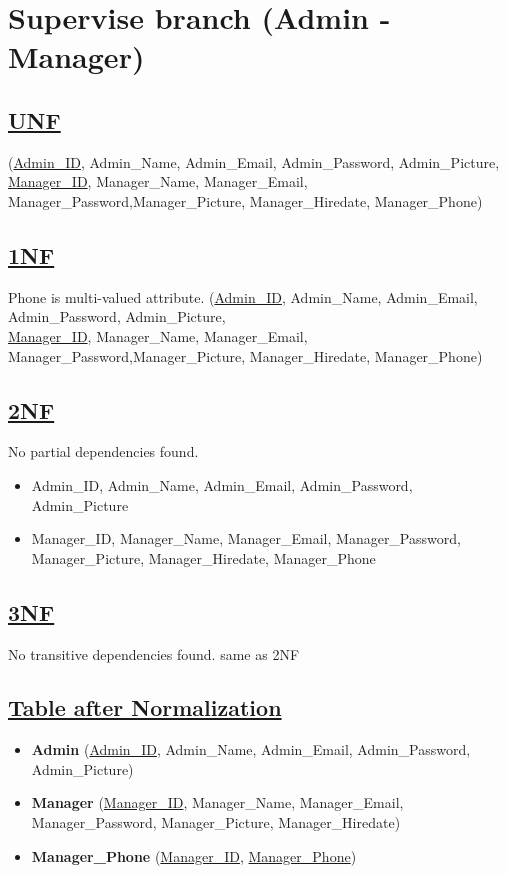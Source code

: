 \section{\texorpdfstring{\centering Supervise branch (Admin - Manager)}{Supervise branch (Admin - Manager)}}
\subsection*{\underline{UNF}}

(\underline{Admin\_ID}, Admin\_Name, Admin\_Email, Admin\_Password, Admin\_Picture,\\
\underline{Manager\_ID}, Manager\_Name, Manager\_Email, Manager\_Password,Manager\_Picture, Manager\_Hiredate, Manager\_Phone)

\subsection*{\underline{1NF}}
Phone is multi-valued attribute.
\vskip 0.2in
(\underline{Admin\_ID}, Admin\_Name, Admin\_Email, Admin\_Password, Admin\_Picture,\\
\underline{Manager\_ID}, Manager\_Name, Manager\_Email, Manager\_Password,Manager\_Picture, Manager\_Hiredate, Manager\_Phone)

\subsection*{\underline{2NF}}
No partial dependencies found.
\vskip 0.2in

\begin{itemize}
    \item Admin\_ID, Admin\_Name, Admin\_Email, Admin\_Password, Admin\_Picture
    \item Manager\_ID, Manager\_Name, Manager\_Email, Manager\_Password, Manager\_Picture, Manager\_Hiredate, Manager\_Phone
\end{itemize}

\subsection*{\underline{3NF}}
No transitive dependencies found.
\vskip 0.2in
same as 2NF

\subsection*{\underline{Table after Normalization}}
\vskip 0.2in
\begin{itemize}
    \item \textbf{Admin} (\underline{Admin\_ID}, Admin\_Name, Admin\_Email, Admin\_Password, Admin\_Picture)
    \item  \textbf{Manager} (\underline{Manager\_ID}, Manager\_Name, Manager\_Email, Manager\_Password, Manager\_Picture, Manager\_Hiredate)
    \item  \textbf{Manager\_Phone} (\underline{Manager\_ID}, \underline{Manager\_Phone})
\end{itemize}

\clearpage